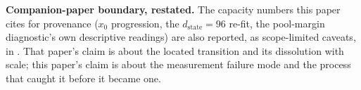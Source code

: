 \documentclass[10pt,letterpaper]{article}
\newcommand{\dstate}{d_{\mathrm{state}}}
\begin{document}
\textbf{Companion-paper boundary, restated.} The capacity numbers this
paper cites for provenance ($x_0$ progression, the $\dstate=96$ re-fit,
the pool-margin diagnostic's own descriptive readings) are also reported,
as scope-limited caveats, in \citet{larson2026capacitycliff}. That paper's
claim is about the located transition and its dissolution with scale;
this paper's claim is about the measurement failure mode and the process
that caught it before it became one.



\end{document}
